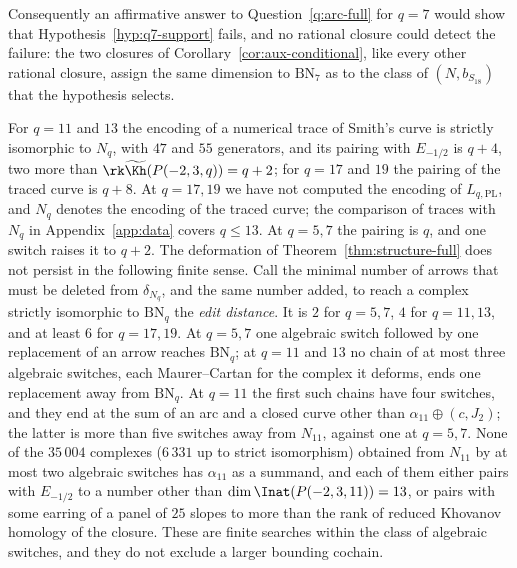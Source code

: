 Consequently an affirmative answer to Question~\ref{q:arc-full} for $q=7$ would show that
Hypothesis~\ref{hyp:q7-support} fails, and no rational closure could detect the failure: the two
closures of Corollary~\ref{cor:aux-conditional}, like every other rational closure, assign the same
dimension to $\mathrm{BN}_7$ as to the class of $(N,b_{S_{18}})$ that the hypothesis selects.

\begin{remark}\label{rem:q11}
For $q=11$ and $13$ the encoding of a numerical trace of Smith's curve is strictly isomorphic to
$N_q$, with $47$ and $55$ generators, and its pairing with $E_{-1/2}$ is $q+4$, two more than
$\rk\widetilde{\Kh}(P(-2,3,q))=q+2$; for $q=17$ and $19$ the pairing of the traced curve is $q+8$.  At $q=17,19$ we
have not computed the encoding of $L_{q,\mathrm{PL}}$, and $N_q$ denotes the encoding of the traced curve; the
comparison of traces with $N_q$ in Appendix~\ref{app:data} covers $q\le13$.  At
$q=5,7$ the pairing is $q$, and one switch raises it to $q+2$.  The deformation of
Theorem~\ref{thm:structure-full} does not persist in the following finite sense.  Call the minimal
number of arrows that must be deleted from $\delta_{N_q}$, and the same number added, to reach a
complex strictly isomorphic to $\mathrm{BN}_q$ the \emph{edit distance}.  It is $2$ for $q=5,7$, $4$
for $q=11,13$, and at least $6$ for $q=17,19$.  At $q=5,7$ one algebraic switch followed by one
replacement of an arrow reaches $\mathrm{BN}_q$; at $q=11$ and $13$ no chain of at most three
algebraic switches, each Maurer--Cartan for the complex it deforms, ends one replacement away from
$\mathrm{BN}_q$.  At $q=11$ the first such chains have four switches, and they end at the sum of an
arc and a closed curve other than $\alpha_{11}\oplus(c,J_2)$; the latter is more than five switches
away from $N_{11}$, against one at $q=5,7$.  None of the $35\,004$ complexes ($6\,331$ up to strict
isomorphism) obtained from $N_{11}$ by at most two algebraic switches has $\alpha_{11}$ as a summand, and each of them either
pairs with $E_{-1/2}$ to a number other than $\dim\Inat(P(-2,3,11))=13$, or pairs with some earring
of a panel of $25$ slopes to more than the rank of reduced Khovanov homology of the closure.  These
are finite searches within the class of algebraic switches, and they do not exclude a larger bounding
cochain.
\end{remark}
